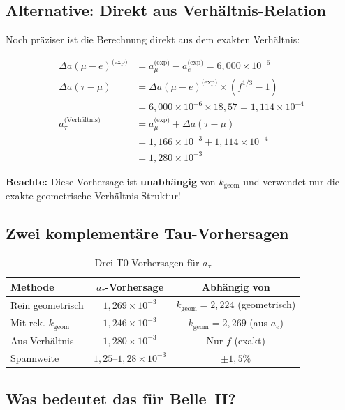 	\subsection{Alternative: Direkt aus Verhältnis-Relation}
	
	Noch präziser ist die Berechnung direkt aus dem exakten Verhältnis:
	
	\begin{align}
		\Delta a(\mu-e)^{\text{(exp)}} &= a_\mu^{\text{(exp)}} - a_e^{\text{(exp)}} = 6{,}000 \times 10^{-6} \\
		\Delta a(\tau-\mu) &= \Delta a(\mu-e)^{\text{(exp)}} \times (f^{1/3} - 1) \\
		&= 6{,}000 \times 10^{-6} \times 18{,}57 = 1{,}114 \times 10^{-4} \\
		a_\tau^{\text{(Verhältnis)}} &= a_\mu^{\text{(exp)}} + \Delta a(\tau-\mu) \\
		&= 1{,}166 \times 10^{-3} + 1{,}114 \times 10^{-4} \\
		&= \boxed{1{,}280 \times 10^{-3}}
	\end{align}
	
	\textbf{Beachte:} Diese Vorhersage ist \textbf{unabhängig} von $k_{\text{geom}}$ und verwendet nur die exakte geometrische Verhältnis-Struktur!
	
	\subsection{Zwei komplementäre Tau-Vorhersagen}
	
	\begin{table}[h]
		\centering
		\begin{tabular}{lcc}
			\toprule
			\textbf{Methode} & \textbf{$a_\tau$-Vorhersage} & \textbf{Abhängig von} \\
			\midrule
			Rein geometrisch & $1{,}269 \times 10^{-3}$ & $k_{\text{geom}} = 2{,}224$ (geometrisch) \\
			Mit rek. $k_{\text{geom}}$ & $1{,}246 \times 10^{-3}$ & $k_{\text{geom}} = 2{,}269$ (aus $a_e$) \\
			Aus Verhältnis & $1{,}280 \times 10^{-3}$ & Nur $f$ (exakt) \\
			\midrule
			Spannweite & $1{,}25$--$1{,}28 \times 10^{-3}$ & $\pm 1{,}5\%$ \\
			\bottomrule
		\end{tabular}
		\caption{Drei T0-Vorhersagen für $a_\tau$}
	\end{table}
	
	\subsection{Was bedeutet das für Belle~II?}
	
